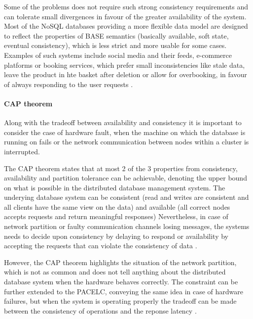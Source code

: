 Some of the problems does not require such strong consistency requirements and can tolerate small divergences in favour of the greater availability of the system. Most of the NoSQL databases providing a more flexible data model are designed to reflect the properties of BASE semantics (basically available, soft state, eventual consistency), which is less strict and more usable for some cases. Examples of such systems include social media and their feeds, e-commerce platforms or booking services, which prefer small inconsistencies like stale data, leave the product in hte basket after deletion or allow for overbooking, in favour of always responding to the user requests \cite{NoSQLDatabaseSystemsSurveyDecisionGuidance}.

\paragraph*{CAP theorem}

Along with the tradeoff between availability and consistency it is important to consider the case of hardware fault, when the machine on which the database is running on fails or the network communication between nodes within a cluster is interrupted. 

The CAP theorem states that at most 2 of the 3 properties from consistency, availability and partition tolerance can be achievable, denoting the upper bound on what is possible in the distributed database management system. The underying database system can be consistent (read and writes are consistent and all clients have the same view on the data) and available (all correct nodes accepts requests and return meaningful responses) Nevertheless, in case of network partition or faulty communication channels losing messages, the systems needs to decide upon consistency by delaying to respond or availability by accepting the requests that can violate the consistency of data \cite{PerspectivesOnArchitectureEvolution}.

However, the CAP theorem highlights the situation of the network partition, which is not as common and does not tell anything about the distributed database system when the hardware behaves correctly. The constraint can be further extended to the PACELC, conveying the same idea in case of hardware failures, but when the system is operating properly the tradeoff can be made between the consistency of operations and the reponse latency \cite{NoSQLDatabaseSystemsSurveyDecisionGuidance}.


